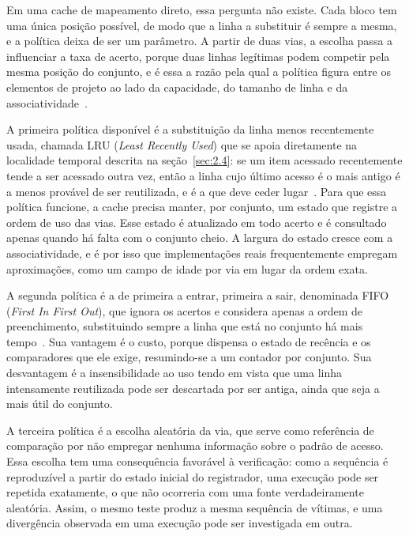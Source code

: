 Em uma cache de mapeamento direto, essa pergunta não existe. Cada bloco tem uma única posição possível, de modo que a linha a substituir é sempre a mesma, e a política deixa de ser um parâmetro. A partir de duas vias, a escolha passa a influenciar a taxa de acerto, porque duas linhas legítimas podem competir pela mesma posição do conjunto, e é essa a razão pela qual a política figura entre os elementos de projeto ao lado da capacidade, do tamanho de linha e da associatividade~\cite{patterson2020computer}.

A primeira política disponível é a substituição da linha menos recentemente usada, chamada LRU (\emph{Least Recently Used}) que se apoia diretamente na localidade temporal descrita na seção~\ref{sec:2.4}: se um item acessado recentemente tende a ser acessado outra vez, então a linha cujo último acesso é o mais antigo é a menos provável de ser reutilizada, e é a que deve ceder lugar~\cite{patterson2020computer}. Para que essa política funcione, a cache precisa manter, por conjunto, um estado que registre a ordem de uso das vias. Esse estado é atualizado em todo acerto e é consultado apenas quando há falta com o conjunto cheio. A largura do estado cresce com a associatividade, e é por isso que implementações reais frequentemente empregam aproximações, como um campo de idade por via em lugar da ordem exata.

A segunda política é a de primeira a entrar, primeira a sair, denominada FIFO (\emph{First In First Out}), que ignora os acertos e considera apenas a ordem de preenchimento, substituindo sempre a linha que está no conjunto há mais tempo~\cite{patterson2020computer}. Sua vantagem é o custo, porque dispensa o estado de recência e os comparadores que ele exige, resumindo-se a um contador por conjunto. Sua desvantagem é a insensibilidade ao uso tendo em vista que uma linha intensamente reutilizada pode ser descartada por ser antiga, ainda que seja a mais útil do conjunto.

A terceira política é a escolha aleatória da via, que serve como referência de comparação por não empregar nenhuma informação sobre o padrão de acesso. Essa escolha tem uma consequência favorável à verificação: como a sequência é reproduzível a partir do estado inicial do registrador, uma execução pode ser repetida exatamente, o que não ocorreria com uma fonte verdadeiramente aleatória. Assim, o mesmo teste produz a mesma sequência de vítimas, e uma divergência observada em uma execução pode ser investigada em outra.


